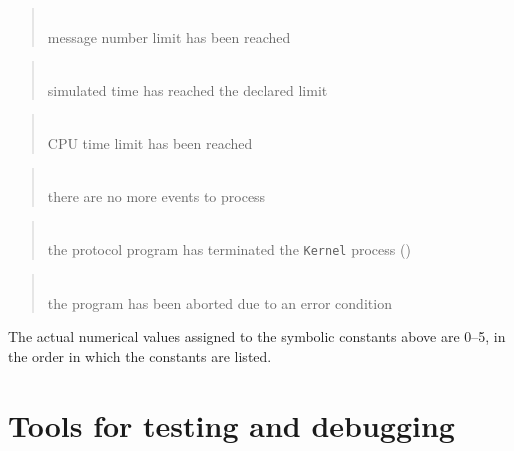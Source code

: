 \medskip

\begin{quote}
\noindent{}\\ \hspace{0in}
message number limit has been reached
\end{quote}

\begin{quote}
\noindent{}\\ \hspace{0in}
simulated time has reached the declared limit
\end{quote}

\begin{quote}
\noindent{}\\ \hspace{0in}
CPU time limit has been reached
\end{quote}

\begin{quote}
\noindent{}\\ \hspace{0in}
there are no more events to process
\end{quote}

\begin{quote}
\noindent{}\\ \hspace{0in}
the protocol program has terminated the {\tt Kernel} process ()
\end{quote}

\begin{quote}
\noindent{}\\ \hspace{0in}
the program has been aborted due to an error condition
\end{quote}\medskip

The actual numerical values assigned to the symbolic constants above
are 0--5, in the order in which the constants are listed.

\section{Tools for testing and debugging}
\label{rm_ob}

